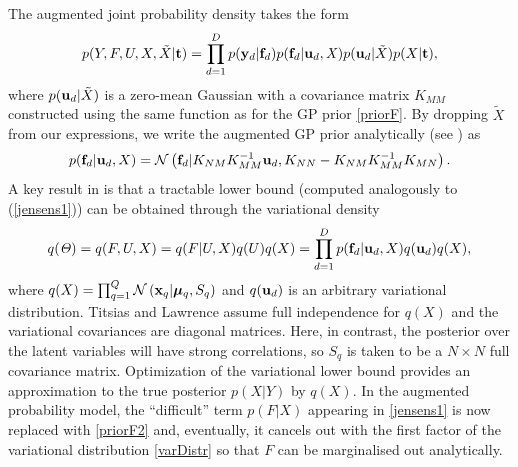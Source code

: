 \documentclass{article} %
\begin{document}
The augmented joint probability density takes the form
\begin{equation}
 \label{augmentedJoint}
p(Y,F, U,X,\tilde{X} | \mathbf{t}) = \prod_{d=1}^D p(\mathbf{y}_d | \mathbf{f}_d) p(\mathbf{f}_d | \mathbf{u}_d, \mathit{X})
p(\mathbf{u}_d | \tilde{X})  p(X | \mathbf{t}),
\end{equation}
where $p(\mathbf{u}_d | \tilde{X})$ is a zero-mean Gaussian with a
covariance matrix $K_{MM}$ constructed using the same function as for
the GP prior \eqref{priorF}. By dropping $\tilde{X}$ from our
expressions, we write the augmented GP prior analytically (see
\cite{rasmussen-williams}) as
\begin{equation}
 \label{priorF2}
p(\mathbf{f}_d | \mathbf{u}_d, X) =  \mathcal{N}  \left( \mathbf{f}_d | K_{NM} K_{MM}^{-1} \mathbf{u}_d , K_{NN} - K_{NM} K_{MM}^{-1} K_{MN} \right).
\end{equation}
A key result in \cite{BayesianGPLVM}
 is that a tractable lower bound 
(computed analogously to (\ref{jensens1})) can be obtained through the variational density
\begin{equation}
\label{varDistr}
q(\mathit{\Theta}) = q(F, U,X) = q(F | U, X) q(U) q(X) = \prod_{d=1}^D p(\mathbf{f}_d | \mathbf{u}_d, X )q(\mathbf{u}_d) q(X),
\end{equation}
%
where $q(X) = \prod_{q=1}^Q \mathcal{N} \left( \mathbf{x}_q | \boldsymbol \mu_q, S_q
\right)$ and $q(\mathbf{u}_d)$ is an arbitrary variational distribution. 
Titsias and Lawrence \cite{BayesianGPLVM} assume full independence for
$q(X)$ and the variational covariances are diagonal matrices.
%
Here, in contrast, 
the posterior over the latent variables will have strong correlations, 
so $S_q$ is taken to be a $N \times N$ full covariance
matrix. Optimization of the variational lower bound provides 
an approximation to the true posterior $p(X|Y)$ by $q(X)$.
%
In the augmented probability model, the ``difficult'' term $p(F | X)$
appearing in \eqref{jensens1} is now replaced with \eqref{priorF2}
and, eventually, it cancels out with the first factor of the
variational distribution \eqref{varDistr} so that $F$ can be
marginalised out analytically.
% 
%
\end{document}
